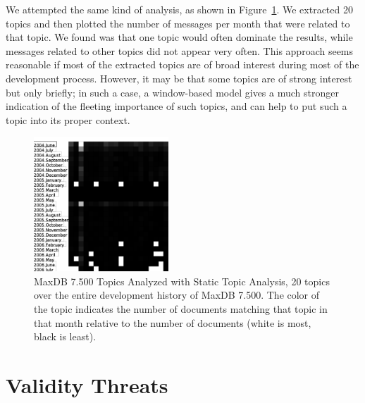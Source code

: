 \documentclass[times, 10pt,twocolumn]{article}
\begin{document}
We attempted the same kind of analysis, as shown in
Figure~\ref{fig:statictopics}. We extracted 20 topics and then plotted
the number of messages per month that were related to that topic. We
found was that one topic would often dominate the results, while
messages related to other topics did not appear very often.
This approach seems reasonable if most of the extracted topics are of
broad interest during most of the development process.  However, it
may be that some topics are of strong interest but only briefly; in
such a case, a window-based model gives a much stronger indication of
the fleeting importance of such topics, and can help to put such a
topic into its proper context.

\begin{figure}
  \centering
  \includegraphics[width=0.45\textwidth]{maxdb7500-everything-by-month}
  \caption{MaxDB 7.500 Topics Analyzed with Static Topic Analysis, 20
    topics over the entire development history of MaxDB 7.500. The
    color of the topic indicates the number of documents matching that
    topic in that month relative to the number of documents (white is
    most, black is least).}
  \label{fig:statictopics}
\end{figure}




\section{Validity Threats}
\end{document}

